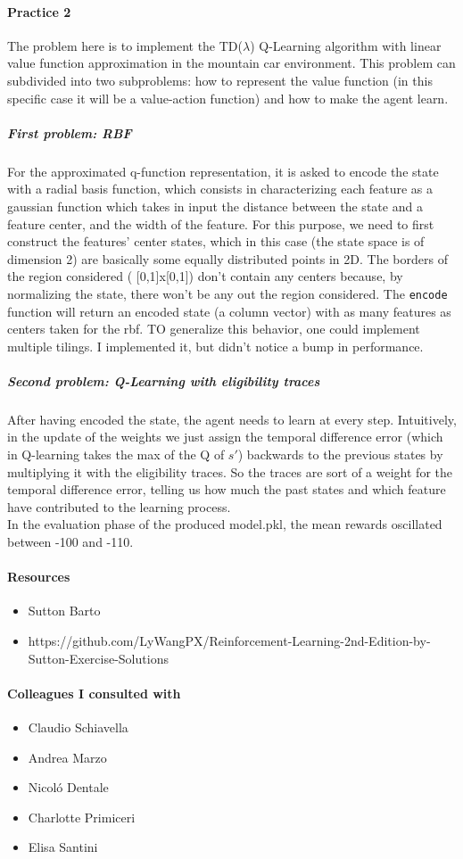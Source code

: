\documentclass[12pt,a4paper]{extarticle}
\def\code#1{\texttt{#1}}
\begin{document}
\paragraph{Practice 2}
The problem here is to implement the TD($\lambda$) Q-Learning algorithm with linear value function approximation in the mountain car environment. This problem can subdivided into two subproblems: how to represent the value function (in this specific case it will be a value-action function) and how to make the agent learn.
\subparagraph{First problem: RBF} For the approximated q-function representation, it is asked to encode the state with a radial basis function, which consists in characterizing each feature as a gaussian function which takes in input the distance between the state and a feature center, and the width of the feature. For this purpose, we need to first construct the features' center states, which in this case (the state space is of dimension 2) are basically some equally distributed points in 2D. The borders of the region considered ( [0,1]x[0,1]) don't contain any centers because, by normalizing the state, there won't be any out the region considered. The \code{encode} function will return an encoded state (a column vector) with as many features as centers taken for the rbf. TO generalize this behavior, one could implement multiple tilings. I implemented it, but didn't notice a bump in performance.
\subparagraph{Second problem: Q-Learning with eligibility traces} After having encoded the state, the agent needs to learn at every step. Intuitively, in the update of the weights we just assign the temporal difference  error (which in Q-learning takes the max of the Q of $s'$) backwards to the previous states by multiplying it with the eligibility traces. So the traces are sort of a weight for the temporal difference error, telling us how much the past states and which feature have contributed  to the learning process.\\
In the evaluation phase of the produced model.pkl, the mean rewards oscillated between -100 and -110.


\paragraph {Resources}
\begin{itemize}
\item Sutton Barto
\item https://github.com/LyWangPX/Reinforcement-Learning-2nd-Edition-by-Sutton-Exercise-Solutions
\end{itemize}

\paragraph {Colleagues I consulted with}

\begin{itemize}
\item Claudio Schiavella
\item Andrea Marzo
\item Nicoló Dentale
\item Charlotte Primiceri
\item Elisa Santini
\end{itemize}
\end{document}
